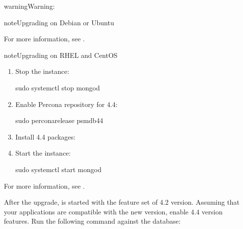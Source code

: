 \documentclass[letterpaper,10pt,english]{sphinxmanual}
\begin{document}
\begin{sphinxadmonition}{warning}{Warning:}
\begin{sphinxadmonition}{note}{Upgrading on Debian or Ubuntu}
\begin{enumerate}
\end{enumerate}

\sphinxAtStartPar
For more information, see {\hyperref[\detokenize{install/apt:apt}]{}}.
\end{sphinxadmonition}

\begin{sphinxadmonition}{note}{Upgrading on RHEL and CentOS}
\begin{enumerate}
%
\item {} 
\sphinxAtStartPar
Stop the  instance:

\begin{sphinxVerbatim}[commandchars=\\\{\}]
\PYGZdl{} sudo systemctl stop mongod
\end{sphinxVerbatim}

\item {} 
\sphinxAtStartPar
Enable Percona repository for  4.4:

\begin{sphinxVerbatim}[commandchars=\\\{\}]
\PYGZdl{} sudo percona\PYGZhy{}release  psmdb\PYGZhy{}44
\end{sphinxVerbatim}

\item {} 
\sphinxAtStartPar
Install  4.4 packages:

\item {} 
\sphinxAtStartPar
Start the  instance:

\begin{sphinxVerbatim}[commandchars=\\\{\}]
\PYGZdl{} sudo systemctl start mongod
\end{sphinxVerbatim}

\end{enumerate}

\sphinxAtStartPar
For more information, see {\hyperref[\detokenize{install/yum:yum}]{}}.
\end{sphinxadmonition}
\end{sphinxadmonition}

\sphinxAtStartPar
After the upgrade,  is started with the feature set of 4.2 version. Assuming that your applications are compatible with the new version, enable 4.4 version features. Run the following command against the  database:
\end{document}
